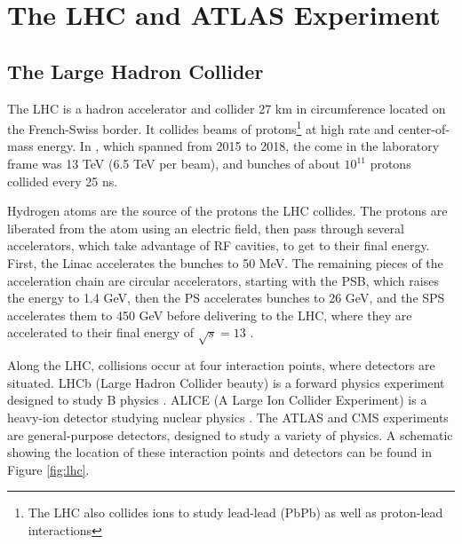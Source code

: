 \chapter{The LHC and ATLAS Experiment}

\section{The Large Hadron Collider}
The \gls{LHC} \cite{lhc} is a hadron accelerator and collider 27 km in circumference located on the French-Swiss border. It collides beams of protons\footnote{The LHC also collides ions to study lead-lead (PbPb) as well as proton-lead interactions} at high rate and center-of-mass energy. In \RunTwo, which spanned from 2015 to 2018, the \gls{come} in the laboratory frame was 13 TeV (6.5 TeV per beam), and bunches of about $10^{11}$ protons collided every 25 ns.

Hydrogen atoms are the source of the protons the \gls{LHC} collides. The protons are liberated from the atom using an electric field, then pass through several accelerators, which take advantage of \gls{RF} cavities, to get to their final energy. First, the \gls{Linac} accelerates the bunches to 50 MeV. The remaining pieces of the acceleration chain are circular accelerators, starting with the \gls{PSB}, which raises the energy to 1.4 GeV, then the \gls{PS} accelerates bunches to 26 GeV, and the \gls{SPS} accelerates them to 450 GeV before delivering to the \gls{LHC}, where they are accelerated to their final energy of $\sqrt{s} = 13 $ \TeV.

Along the \gls{LHC}, collisions occur at four interaction points, where detectors are situated. LHCb (Large Hadron Collider beauty) is a forward physics experiment designed to study B physics \cite{lhcb}. ALICE (A Large Ion Collider Experiment) is a heavy-ion detector studying nuclear physics \cite{alice}. The ATLAS \cite{atlas-experiment} and \gls{CMS} \cite{cms} experiments are general-purpose detectors, designed to study a variety of physics. A schematic showing the location of these interaction points and detectors can be found in Figure \ref{fig:lhc}.

